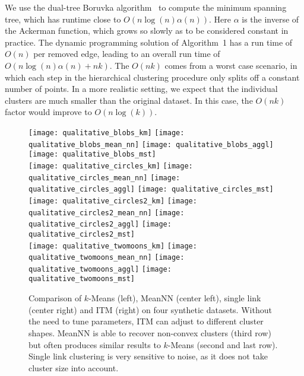 We use the dual-tree Boruvka algorithm~\citep{dtb2010} to compute the minimum
spanning tree, which has runtime close to $O(n \log(n) \alpha(n))$. Here
$\alpha$ is the inverse of the Ackerman function, which grows so slowly as to
be considered constant in practice. The dynamic programming solution of
Algorithm~1 has a run time of $O(n)$ per removed edge, leading to an overall
run time of $O(n \log(n) \alpha(n)+ nk)$. The $O(nk)$ comes from a worst case
scenario, in which each step in the hierarchical clustering procedure only
splits off a constant number of points. In a more realistic setting, we expect
that the individual clusters are much smaller than the original dataset. In
this case, the $O(nk)$ factor would improve to $O(n\log(k))$.


\begin{figure}[t]
\centering
\texttt{[image: qualitative\_blobs\_km]}
\texttt{[image: qualitative\_blobs\_mean\_nn]}
\texttt{[image: qualitative\_blobs\_aggl]}
\texttt{[image: qualitative\_blobs\_mst]} \\ 

\texttt{[image: qualitative\_circles\_km]}
\texttt{[image: qualitative\_circles\_mean\_nn]}
\texttt{[image: qualitative\_circles\_aggl]}
\texttt{[image: qualitative\_circles\_mst]} \\ 

\texttt{[image: qualitative\_circles2\_km]}
\texttt{[image: qualitative\_circles2\_mean\_nn]}
\texttt{[image: qualitative\_circles2\_aggl]}
\texttt{[image: qualitative\_circles2\_mst]} \\ 

\texttt{[image: qualitative\_twomoons\_km]}
\texttt{[image: qualitative\_twomoons\_mean\_nn]}
\texttt{[image: qualitative\_twomoons\_aggl]}
\texttt{[image: qualitative\_twomoons\_mst]} \\ 
\caption{Comparison of $k$-Means (left), MeanNN (center left), single link
(center right) and ITM (right) on four synthetic datasets.  Without the need to
tune parameters, ITM can adjust to different cluster shapes.  MeanNN is able to
recover non-convex clusters (third row) but often produces similar results to
$k$-Means (second and last row). Single link clustering is very sensitive
to noise, as it does not take cluster size into account.}
\label{qualitative}
\end{figure}

